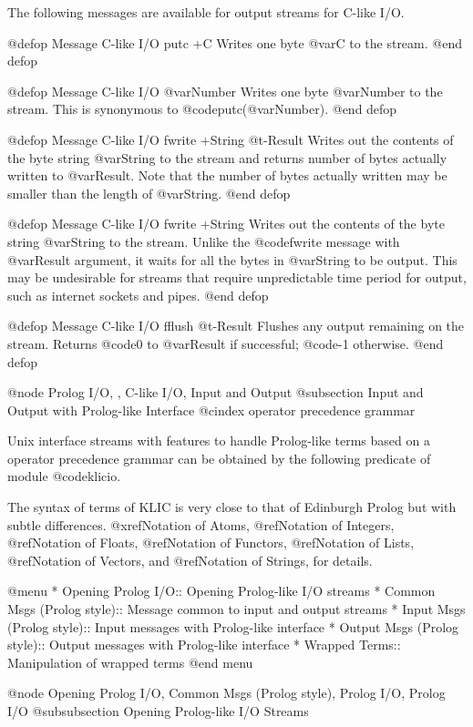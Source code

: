 {{{{The following messages are available for output streams for C-like I/O.

@defop {Message} {C-like I/O} putc +C
Writes one byte @var{C} to the stream.
@end defop

@defop {Message} {C-like I/O} @var{Number}
Writes one byte @var{Number} to the stream.  This is synonymous to
@code{putc(@var{Number})}.
@end defop

@defop {Message} {C-like I/O} fwrite +String @t{-}Result
Writes out the contents of the byte string @var{String} to the stream
and returns number of bytes actually written to @var{Result}.  Note that
the number of bytes actually written may be smaller than the length of
@var{String}.
@end defop

@defop {Message} {C-like I/O} fwrite +String
Writes out the contents of the byte string @var{String} to the stream.
Unlike the @code{fwrite} message with @var{Result} argument, it waits
for all the bytes in @var{String} to be output.  This may be undesirable
for streams that require unpredictable time period for output, such as
internet sockets and pipes.
@end defop

@defop {Message} {C-like I/O} fflush @t{-}Result
Flushes any output remaining on the stream.  Returns @code{0} to
@var{Result} if successful; @code{-1} otherwise.
@end defop

@node Prolog I/O,  , C-like I/O, Input and Output
@subsection Input and Output with Prolog-like Interface
@cindex operator precedence grammar

Unix interface streams with features to handle Prolog-like terms based
on a operator precedence grammar can be obtained by the following
predicate of module @code{klicio}.

The syntax of terms of KLIC is very close to that of Edinburgh Prolog
but with subtle differences.  @xref{Notation of Atoms}, @ref{Notation of
Integers}, @ref{Notation of Floats}, @ref{Notation of Functors},
@ref{Notation of Lists}, @ref{Notation of Vectors}, and @ref{Notation of
Strings}, for details.

@menu
* Opening Prolog I/O::          Opening Prolog-like I/O streams
* Common Msgs (Prolog style)::  Message common to input and output streams
* Input Msgs (Prolog style)::   Input messages with Prolog-like interface
* Output Msgs (Prolog style)::  Output messages with Prolog-like interface
* Wrapped Terms::               Manipulation of wrapped terms
@end menu

@node Opening Prolog I/O, Common Msgs (Prolog style), Prolog I/O, Prolog I/O
@subsubsection Opening Prolog-like I/O Streams

}}}}
